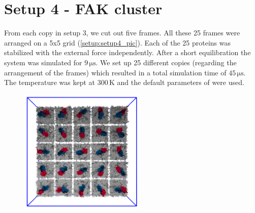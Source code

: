 \section{Setup 4 - FAK cluster}
From each copy in setup 3, we cut out five frames. All these 25 frames were arranged on a {5x5} grid (\autoref{setup:setup4_pic}). Each of the 25 proteins was stabilized with the external force independently. After a short equilibration the system was simulated for $9\,\si{\micro\second}$. We set up 25 different copies (regarding the arrangement of the frames) which resulted in a total simulation time of $45\,\si{\micro\second}$. The temperature was kept at $300\,\si{\kelvin}$ and the default parameters of \martini{} were used.
%
%
%
\begin{figure}[h]
	\centering
	\includegraphics[height=6cm]{figures/setup/setup_cluster}
	\label{setup:setup4_pic}
\end{figure}
%
%
%